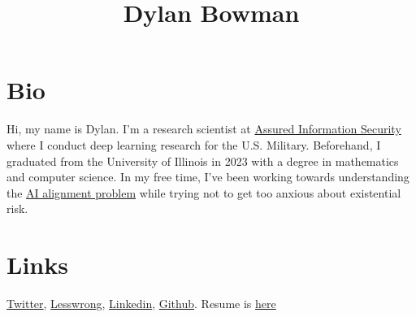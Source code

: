 \documentclass[a4paper]{article}
\date{}
\author{}
\title{Dylan Bowman}
\begin{document}
\maketitle

\section{Bio}

Hi, my name is Dylan. I'm a research scientist at \href{ainfosec.com}{Assured Information Security} where I conduct deep learning research for the U.S. Military. Beforehand, I graduated 
from the University of Illinois in 2023 with a degree in mathematics and computer science. In my free time, I've been working towards understanding the 
\href{https://en.wikipedia.org/wiki/AI_alignment}{AI alignment problem} while trying not to get too anxious about existential risk.

\section{Links}
\href{https://twitter.com/Shark_Academia}{Twitter},
\href{https://www.lesswrong.com/users/dylan-bowman}{Lesswrong},
\href{https://www.linkedin.com/in/dylan-bowman-68a56218b/}{Linkedin},
\href{https://github.com/dylanbowman314}{Github}. 
Resume is \href{https://www.dbow.me/bowman-resume-nocontactinfo.pdf}{here}
\end{document}
